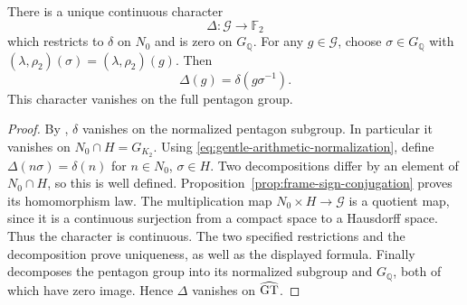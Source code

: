\begin{theorem}
\label{thm:global-frame-character}
There is a unique continuous character
\[
 \Delta:\mathcal G\longrightarrow\mathbb F_2
\]
which restricts to $\delta$ on $N_0$ and is zero on $G_{\mathbb Q}$.
For any $g\in\mathcal G$, choose $\sigma\in G_{\mathbb Q}$
with $(\lambda,\rho_2)(\sigma)=(\lambda,\rho_2)(g)$. Then
\[
 \Delta(g)=\delta(g\sigma^{-1}).
\]
This character vanishes on the full pentagon group.
\end{theorem}

\begin{proof}
By \cite[Theorem~3]{H17}, $\delta$ vanishes on the normalized
pentagon subgroup. In particular it vanishes on
$N_0\cap H=G_{K_2}$. Using
\eqref{eq:gentle-arithmetic-normalization}, define
$\Delta(n\sigma)=\delta(n)$ for $n\in N_0$, $\sigma\in H$.
Two decompositions differ by an element of $N_0\cap H$, so this
is well defined. Proposition~\ref{prop:frame-sign-conjugation}
proves its homomorphism law. The multiplication map
$N_0\times H\to\mathcal G$ is a quotient map, since it is a
continuous surjection from a compact space to a Hausdorff space.
Thus the character is continuous. The two specified restrictions
and the decomposition prove uniqueness, as well as the displayed
formula. Finally \cite[Theorem~2]{H17} decomposes the pentagon
group into its normalized subgroup and $G_{\mathbb Q}$, both of
which have zero image. Hence $\Delta$ vanishes on $\widehat{\mathrm{GT}}$.
\end{proof}
